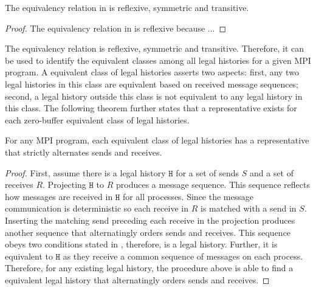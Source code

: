 \begin{lemma}
The equivalency relation in  is reflexive, symmetric and transitive.
\end{lemma}

\begin{proof}
The equivalency relation in  is reflexive because ...
\end{proof}

The equivalency relation is reflexive, symmetric and transitive. Therefore, it can be used to identify the equivalent classes among all legal histories for a given MPI program. A equivalent class of legal histories asserts two aspects: first, any two legal histories in this class are equivalent based on received message sequences; second, a legal history outside this class is not equivalent to any legal history in this class. The following theorem further states that a representative exists for each zero-buffer equivalent class of legal histories. 

\begin{theorem}
For any MPI program, each equivalent class of legal histories has a representative that strictly alternates sends and receives.
\end{theorem}

\begin{proof}
First, assume there is a legal history $\mathtt{H}$ for a set of sends $\mathit{S}$ and a set of receives $\mathit{R}$. 
Projecting $\mathtt{H}$ to $\mathit{R}$ produces a message sequence. This sequence reflects how messages are received in $\mathtt{H}$ for all processes. Since the message communication is deterministic so each receive in $\mathit{R}$ is matched with a send in $\mathit{S}$. Inserting the matching send preceding each receive in the projection produces another sequence that alternatingly orders sends and receives. This sequence obeys two conditions stated in , therefore, is a legal history. Further, it is equivalent to $\mathtt{H}$ as they receive a common sequence of messages on each process.
Therefore, for any existing legal history, the procedure above is able to find a equivalent legal history that alternatingly orders sends and receives.  
\end{proof}



 


